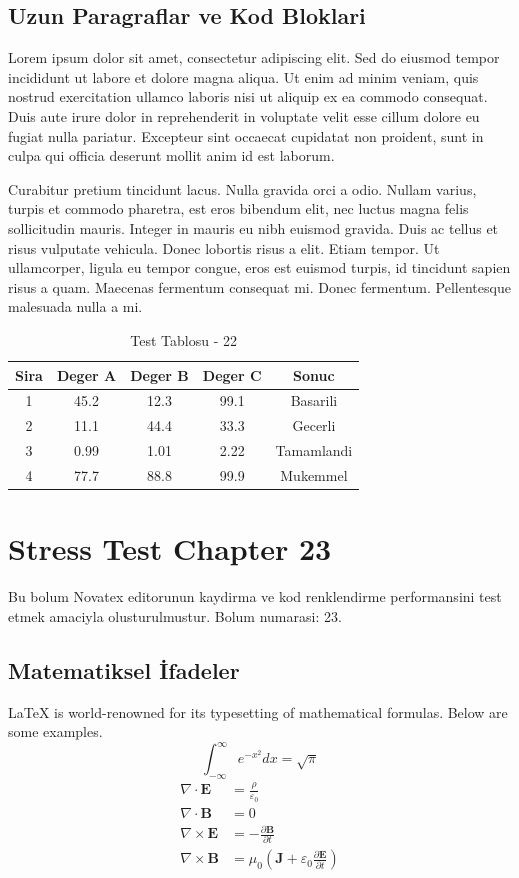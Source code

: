 \documentclass[12pt,a4paper]{article}
\begin{document}
\subsection{Uzun Paragraflar ve Kod Bloklari}
Lorem ipsum dolor sit amet, consectetur adipiscing elit. Sed do eiusmod tempor incididunt ut labore et dolore magna aliqua. Ut enim ad minim veniam, quis nostrud exercitation ullamco laboris nisi ut aliquip ex ea commodo consequat. Duis aute irure dolor in reprehenderit in voluptate velit esse cillum dolore eu fugiat nulla pariatur. Excepteur sint occaecat cupidatat non proident, sunt in culpa qui officia deserunt mollit anim id est laborum.

Curabitur pretium tincidunt lacus. Nulla gravida orci a odio. Nullam varius, turpis et commodo pharetra, est eros bibendum elit, nec luctus magna felis sollicitudin mauris. Integer in mauris eu nibh euismod gravida. Duis ac tellus et risus vulputate vehicula. Donec lobortis risus a elit. Etiam tempor. Ut ullamcorper, ligula eu tempor congue, eros est euismod turpis, id tincidunt sapien risus a quam. Maecenas fermentum consequat mi. Donec fermentum. Pellentesque malesuada nulla a mi.

\begin{table}[h!]
\centering
\begin{tabular}{|c|c|c|c|c|}
\hline
\textbf{Sira} & \textbf{Deger A} & \textbf{Deger B} & \textbf{Deger C} & \textbf{Sonuc} \\
\hline
1 & 45.2 & 12.3 & 99.1 & Basarili \\
2 & 11.1 & 44.4 & 33.3 & Gecerli \\
3 & 0.99 & 1.01 & 2.22 & Tamamlandi \\
4 & 77.7 & 88.8 & 99.9 & Mukemmel \\
\hline
\end{tabular}
\caption{Test Tablosu - 22}
\end{table}

\newpage
\section{Stress Test Chapter 23}
Bu bolum Novatex editorunun kaydirma ve kod renklendirme performansini test etmek amaciyla olusturulmustur. Bolum numarasi: 23.

\subsection{Matematiksel İfadeler}
\LaTeX{} is world-renowned for its typesetting of mathematical formulas. Below are some examples.
\begin{equation}
\int_{-\infty}^{\infty} e^{-x^2} dx = \sqrt{\pi}
\end{equation}
\begin{align}
\nabla \cdot \mathbf{E} &= \frac{\rho}{\varepsilon_0} \\
\nabla \cdot \mathbf{B} &= 0 \\
\nabla \times \mathbf{E} &= -\frac{\partial \mathbf{B}}{\partial t} \\
\nabla \times \mathbf{B} &= \mu_0\left(\mathbf{J} + \varepsilon_0 \frac{\partial \mathbf{E}}{\partial t}\right)
\end{align}
\end{document}

